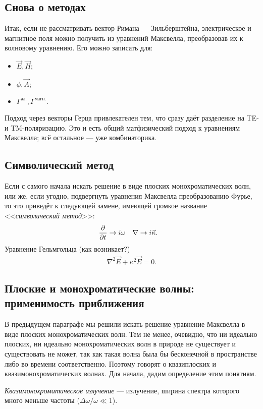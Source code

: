 \subsection{Снова о методах}
Итак, если не рассматривать вектор Римана --- Зильберштейна, электрическое и
магнитное поля можно получить из уравнений Максвелла, преобразовав их к волновому уравнению.
Его можно записать для:
\begin{itemize}
	\item \(\vec{E}, \vec{H}\);
	\item \(\phi, \vec{A}\);
	\item \(\Gamma^{\text{эл.}}, \Gamma^{\text{магн.}}\).
\end{itemize}
Подход через векторы Герца привлекателен тем, что сразу даёт разделение на TE- и TM-поляризацию.
Это и есть общий матфизический подход к уравнениям Максвелла; всё остальное --- уже комбинаторика.

\subsection{Символический метод}
Если с самого начала искать решение в виде плоских монохроматических волн, или же, если угодно, подвергнуть уравнения
Максвелла преобразованию Фурье, то это приведёт к следующей замене, имеющей громкое название <<\emph{символический метод}>>:
\begin{align*}
	\frac{\partial^{} }{\partial t^{}} &\to i\omega &
	\nabla &\to i\vec\kappa.
\end{align*}
Уравнение Гельмгольца (как возникает?)
\begin{align*}
	\nabla^2\vec{E} + \kappa^2\vec{E} = 0.
\end{align*}

\subsection{Плоские и монохроматические волны: применимость приближения}
В предыдущем параграфе мы решили искать решение уравнение Максвелла в виде
плоских монохроматических волн. Тем не менее, очевидно, что ни идеально плоских,
ни идеально монохроматических волн в природе не существует и существовать не
может, так как такая волна была бы бесконечной в пространстве либо во времени
соответственно. Поэтому говорят о квазиплоских и квазимонохроматических волнах.
Для начала, дадим определение этим понятиям.

\emph{Квазимонохроматическое излучение} --- излучение, ширина спектра которого
много меньше частоты (\(\Delta\omega/\omega \ll 1\)).

